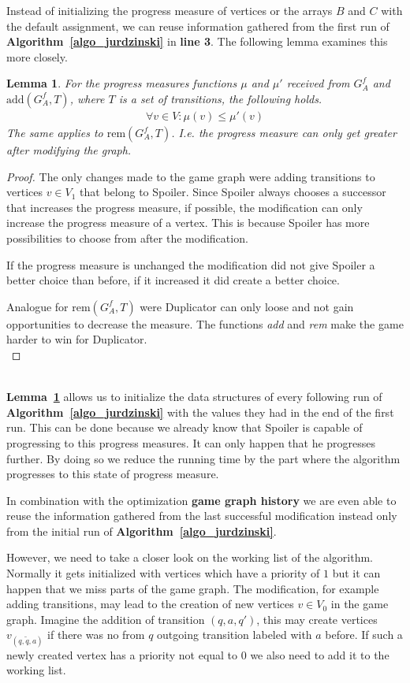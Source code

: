 \documentclass[12pt,oneside,bibliography=totoc,abstracton]{scrartcl}
\newcommand{\lemmaref}[1]{\textbf{Lemma~\ref{#1}}}
\newcommand{\algoref}[1]{\textbf{Algorithm~\ref{#1}}}
\newtheorem{mylemma}{Lemma}
\begin{document}
Instead of initializing the progress measure of vertices or the arrays $B$ and $C$ with the default assignment,
we can reuse information gathered from the first run of \algoref{algo_jurdzinski} in \textbf{line 3}.
The following lemma examines this more closely.
\begin{mylemma}\label{lemma_pmincreases}
	For the progress measures functions $\mu$ and $\mu'$ received from $G^f_A$ and $\text{add}(G^f_A, T)$,
	where $T$ is a set of transitions, the following holds.
	\begin{align*}
		\forall v \in V : \mu(v) \le \mu'(v)
	\end{align*}
	The same applies to $\text{rem}(G^f_A, T)$.
	I.e. the progress measure can only get greater after modifying the graph.
\end{mylemma}
\begin{proof}
	The only changes made to the game graph were adding transitions to vertices $v \in V_1$ that belong to Spoiler.
	Since Spoiler always chooses a successor that increases the progress measure, if possible, the modification can only
	increase the progress measure of a vertex. This is because Spoiler has more possibilities to choose from
	after the modification.
	
	If the progress measure is unchanged the modification did not give Spoiler a better choice than before,
	if it increased it did create a better choice.
	
	Analogue for $\text{rem}(G^f_A, T)$ were Duplicator can only loose and
	not gain opportunities to decrease the measure. The functions \textit{add} and \textit{rem} make the
	game harder to win for Duplicator.\\
\end{proof}\quad\\
\lemmaref{lemma_pmincreases} allows us to initialize the data structures of every following run of \algoref{algo_jurdzinski}
with the values they had in the end of the first run. This can be done because we already know that Spoiler is capable of progressing
to this progress measures. It can only happen that he progresses further. By doing so we reduce the running
time by the part where the algorithm progresses to this state of progress measure.

In combination with the optimization \textbf{game graph history} we are even able to reuse the information gathered
from the last successful modification instead only from the initial run of \algoref{algo_jurdzinski}.

However, we need to take a closer look on the working list of the algorithm. Normally it gets initialized with vertices which have
a priority of $1$ but it can happen that we miss parts of the game graph. The modification, for example adding transitions,
may lead to the creation of new vertices $v \in V_0$ in the game graph. Imagine the addition of transition $(q, a, q')$,
this may create vertices $v_{(q, \tilde{q}, a)}$ if there was no from $q$ outgoing transition labeled with $a$ before.
If such a newly created vertex has a priority not equal to $0$ we also need to add it to the working list.
\end{document}
